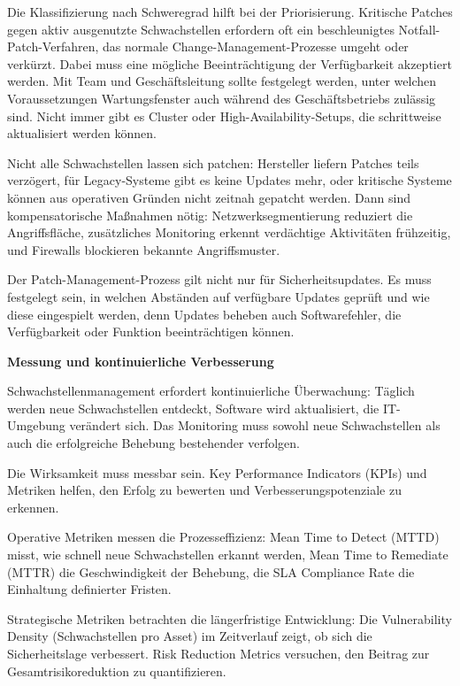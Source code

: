 Die Klassifizierung nach Schweregrad hilft bei der Priorisierung. Kritische Patches gegen aktiv ausgenutzte Schwachstellen erfordern oft ein beschleunigtes Notfall-Patch-Verfahren, das normale Change-Management-Prozesse umgeht oder verkürzt. Dabei muss eine mögliche Beeinträchtigung der Verfügbarkeit akzeptiert werden. Mit Team und Geschäftsleitung sollte festgelegt werden, unter welchen Voraussetzungen Wartungsfenster auch während des Geschäftsbetriebs zulässig sind. Nicht immer gibt es Cluster oder High-Availability-Setups, die schrittweise aktualisiert werden können.

Nicht alle Schwachstellen lassen sich patchen: Hersteller liefern Patches teils verzögert, für Legacy-Systeme gibt es keine Updates mehr, oder kritische Systeme können aus operativen Gründen nicht zeitnah gepatcht werden. Dann sind kompensatorische Maßnahmen nötig: Netzwerksegmentierung reduziert die Angriffsfläche, zusätzliches Monitoring erkennt verdächtige Aktivitäten frühzeitig, und Firewalls blockieren bekannte Angriffsmuster.

Der Patch-Management-Prozess gilt nicht nur für Sicherheitsupdates. Es muss festgelegt sein, in welchen Abständen auf verfügbare Updates geprüft und wie diese eingespielt werden, denn Updates beheben auch Softwarefehler, die Verfügbarkeit oder Funktion beeinträchtigen können.

\textbf{Messung und kontinuierliche Verbesserung}

Schwachstellenmanagement erfordert kontinuierliche Überwachung: Täglich werden neue Schwachstellen entdeckt, Software wird aktualisiert, die IT-Umgebung verändert sich. Das Monitoring muss sowohl neue Schwachstellen als auch die erfolgreiche Behebung bestehender verfolgen.

Die Wirksamkeit muss messbar sein. Key Performance Indicators (KPIs) und Metriken helfen, den Erfolg zu bewerten und Verbesserungspotenziale zu erkennen.

Operative Metriken messen die Prozesseffizienz: Mean Time to Detect (MTTD) misst, wie schnell neue Schwachstellen erkannt werden, Mean Time to Remediate (MTTR) die Geschwindigkeit der Behebung, die SLA Compliance Rate die Einhaltung definierter Fristen.

Strategische Metriken betrachten die längerfristige Entwicklung: Die Vulnerability Density (Schwachstellen pro Asset) im Zeitverlauf zeigt, ob sich die Sicherheitslage verbessert. Risk Reduction Metrics versuchen, den Beitrag zur Gesamtrisikoreduktion zu quantifizieren.

